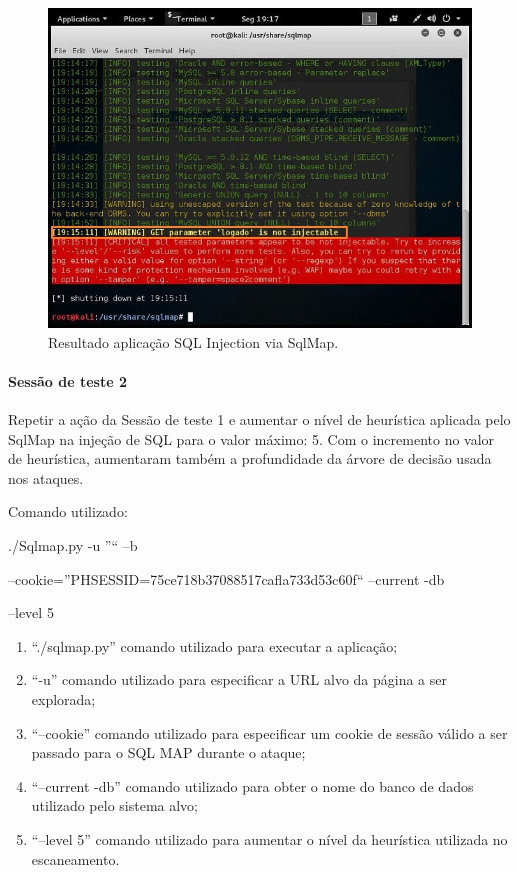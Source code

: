 \documentclass[
    12pt,               %
    openright,          %
    oneside,            %
    a4paper,            %
    section=TITLE,     %
    english,            %
    french,             %
    spanish,            %
    brazil              %
    ]{abntex2}
\begin{document}
\begin{figure}[htp]
\centering
\caption{Resultado aplicação SQL Injection via SqlMap.}
\includegraphics[width=450px]{image14.jpeg}
\end{figure}
\ifdefined\FloatBarrier \FloatBarrier \fi



\paragraph*{Sessão de teste 2}

Repetir a ação da Sessão de teste 1 e aumentar o nível de heurística aplicada pelo SqlMap na injeção de SQL para o valor máximo: 5. Com o incremento no valor de heurística, aumentaram também a profundidade da árvore de decisão usada nos ataques.


Comando utilizado:


./Sqlmap.py -u ''`` --b


--cookie=''PHSESSID=75ce718b37088517cafla733d53c60f`` --current -db


--level 5



\begin{enumerate}[start=1]
	
\item \textquotedblleft{}./sqlmap.py\textquotedblright{} comando utilizado para executar a aplicação;
	
\item \textquotedblleft{}-u\textquotedblright{} comando utilizado para especificar a URL alvo da página a ser explorada;
	
\item \textquotedblleft{}--cookie\textquotedblright{} comando utilizado para especificar um cookie de sessão válido a ser passado para o SQL MAP durante o ataque;
	
\item \textquotedblleft{}--current -db\textquotedblright{} comando utilizado para obter o nome do banco de dados utilizado pelo sistema alvo;
	
\item \textquotedblleft{}--level 5\textquotedblright{} comando utilizado para aumentar o nível da heurística utilizada no escaneamento.

\end{enumerate}
\end{document}
